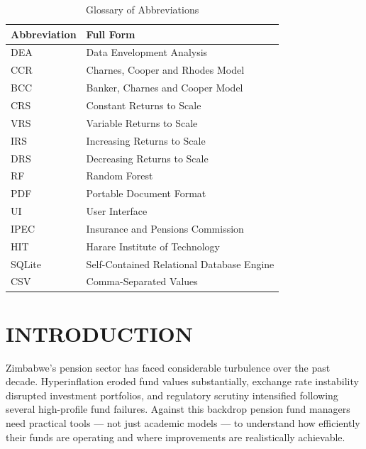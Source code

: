 \documentclass[12pt,a4paper]{report}
\begin{document}
\begin{table}[H]
\centering
\begin{tabular}{|l|l|}
\hline
\textbf{Abbreviation} & \textbf{Full Form} \\
\hline
DEA   & Data Envelopment Analysis \\
\hline
CCR   & Charnes, Cooper and Rhodes Model \\
\hline
BCC   & Banker, Charnes and Cooper Model \\
\hline
CRS   & Constant Returns to Scale \\
\hline
VRS   & Variable Returns to Scale \\
\hline
IRS   & Increasing Returns to Scale \\
\hline
DRS   & Decreasing Returns to Scale \\
\hline
RF    & Random Forest \\
\hline
PDF   & Portable Document Format \\
\hline
UI    & User Interface \\
\hline
IPEC  & Insurance and Pensions Commission \\
\hline
HIT   & Harare Institute of Technology \\
\hline
SQLite & Self-Contained Relational Database Engine \\
\hline
CSV   & Comma-Separated Values \\
\hline
\end{tabular}
\caption{Glossary of Abbreviations}
\label{tab:abbrev}
\end{table}
\newpage


\chapter{INTRODUCTION}

Zimbabwe's pension sector has faced considerable turbulence over the past decade.
Hyperinflation eroded fund values substantially, exchange rate instability disrupted
investment portfolios, and regulatory scrutiny intensified following several high-profile
fund failures. Against this backdrop pension fund managers need practical tools --- not
just academic models --- to understand how efficiently their funds are operating and where
improvements are realistically achievable.
\end{document}
